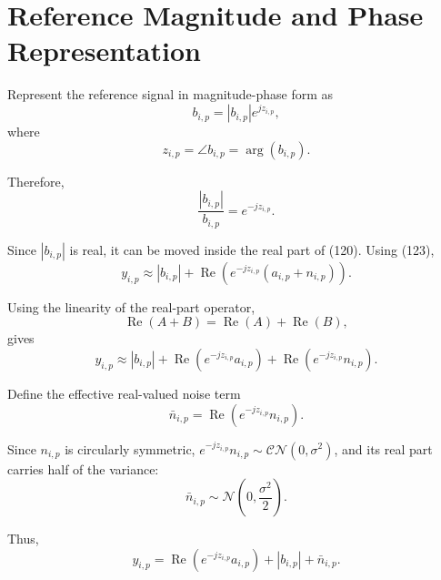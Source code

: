 \documentclass[12pt,a4paper]{article}
\begin{document}
\section{Reference Magnitude and Phase Representation}

Represent the reference signal in magnitude-phase form as
\begin{equation}
b_{i,p}
=
|b_{i,p}|e^{jz_{i,p}},
\tag{121}
\end{equation}
where
\begin{equation}
z_{i,p}
=
\angle b_{i,p}
=
\arg(b_{i,p}).
\tag{122}
\end{equation}

Therefore,
\begin{equation}
\frac{|b_{i,p}|}{b_{i,p}}
=
e^{-jz_{i,p}}.
\tag{123}
\end{equation}

Since $|b_{i,p}|$ is real, it can be moved inside the real part of
(120). Using (123),
\begin{equation}
y_{i,p}
\approx
|b_{i,p}|
+
\operatorname{Re}
\left(
e^{-jz_{i,p}}
(a_{i,p}+n_{i,p})
\right).
\tag{124}
\end{equation}

Using the linearity of the real-part operator,
\begin{equation}
\operatorname{Re}(A+B)
=
\operatorname{Re}(A)
+
\operatorname{Re}(B),
\tag{125}
\end{equation}
gives
\begin{equation}
y_{i,p}
\approx
|b_{i,p}|
+
\operatorname{Re}
\left(
e^{-jz_{i,p}}a_{i,p}
\right)
+
\operatorname{Re}
\left(
e^{-jz_{i,p}}n_{i,p}
\right).
\tag{126}
\end{equation}

Define the effective real-valued noise term
\begin{equation}
\bar n_{i,p}
=
\operatorname{Re}
\left(
e^{-jz_{i,p}}n_{i,p}
\right).
\tag{127}
\end{equation}

Since $n_{i,p}$ is circularly symmetric, $e^{-jz_{i,p}}n_{i,p}\sim
\mathcal{CN}(0,\sigma^2)$, and its real part carries half of the
variance:
\begin{equation}
\boxed{
\bar n_{i,p}
\sim
\mathcal{N}\!\left(0,\frac{\sigma^2}{2}\right)
}.
\tag{127a}
\end{equation}

Thus,
\begin{equation}
\boxed{
y_{i,p}
=
\operatorname{Re}
\left(
e^{-jz_{i,p}}a_{i,p}
\right)
+
|b_{i,p}|
+
\bar n_{i,p}
}.
\tag{128}
\end{equation}
\end{document}
